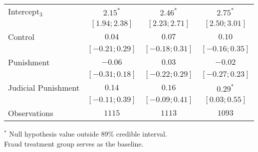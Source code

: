 \begin{table}[h]
\begin{center}
\begin{threeparttable}
\begin{tabular}{l c c c}
Intercept$_3$       & $2.15^{*}$        & $2.46^{*}$        & $2.75^{*}$        \\
                    & $ [ 1.94;  2.38]$ & $ [ 2.23;  2.71]$ & $ [ 2.50;  3.01]$ \\
Control             & $0.04$            & $0.07$            & $0.10$            \\
                    & $ [-0.21;  0.29]$ & $ [-0.18;  0.31]$ & $ [-0.16;  0.35]$ \\
Punishment          & $-0.06$           & $0.03$            & $-0.02$           \\
                    & $ [-0.31;  0.18]$ & $ [-0.22;  0.29]$ & $ [-0.27;  0.23]$ \\
Judicial Punishment & $0.14$            & $0.16$            & $0.29^{*}$        \\
                    & $ [-0.11;  0.39]$ & $ [-0.09;  0.41]$ & $ [ 0.03;  0.55]$ \\
\hline
Observations        & $1115$            & $1113$            & $1093$            \\
\hline
\end{tabular}
\begin{tablenotes}[flushleft]
\scriptsize{$^*$ Null hypothesis value outside 89\% credible interval.  \\
Fraud treatment group serves as the baseline.}
\end{tablenotes}
\end{threeparttable}
\label{table:coefficients}
\end{center}
\end{table}
